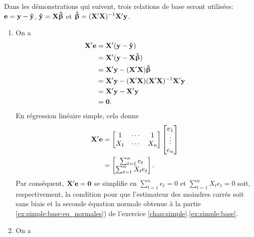 \begin{solution}{3.4}
    Dans les démonstrations qui suivent, trois relations de base
    seront utilisées:
    $\mathbf{e} = \mathbf{y - \hat{y}}$,
    $\mathbf{\hat{y}} = \mathbf{X} \boldsymbol{\hat{\upbeta}}$ et
    $\boldsymbol{\hat{\upbeta}} = (\mathbf{X}^\prime \mathbf{X})^{-1} \mathbf{X}^\prime \mathbf{y}$.
    \begin{enumerate}
    \item On a
      \begin{align*}
        \mathbf{X}^\prime \mathbf{e}
        &= \mathbf{X}^\prime (\mathbf{y - \hat{y}}) \\
        &= \mathbf{X}^\prime (\mathbf{y} - \mathbf{X} \boldsymbol{\hat{\upbeta}}) \\
        &= \mathbf{X}^\prime \mathbf{y} - (\mathbf{X}^\prime \mathbf{X}) \boldsymbol{\hat{\upbeta}} \\
        &= \mathbf{X}^\prime \mathbf{y} - (\mathbf{X}^\prime \mathbf{X})
        (\mathbf{X}^\prime \mathbf{X})^{-1} \mathbf{X}^\prime \mathbf{y} \\
        &= \mathbf{X}^\prime \mathbf{y} - \mathbf{X}^\prime \mathbf{y} \\
        &= \mathbf{0}.
      \end{align*}
      En régression linéaire simple, cela donne
      \begin{align*}
        \mathbf{X}^\prime \mathbf{e} &=
        \begin{bmatrix}
          1   & \cdots & 1  \\
          X_1 & \cdots & X_n
        \end{bmatrix}
        \begin{bmatrix}
          e_1 \\ \vdots \\ e_n
        \end{bmatrix} \\
        &=
        \begin{bmatrix}
          \sum_{t=1}^n e_t \\
          \sum_{t=1}^n X_t e_t
        \end{bmatrix}.
      \end{align*}
      Par conséquent, $\mathbf{X}^\prime \mathbf{e} = \mathbf{0}$ se simplifie
      en $\sum_{t=1}^n e_t = 0$ et $\sum_{t=1}^n X_t e_t = 0$ soit,
      respectivement, la condition pour que l'estimateur des moindres
      carrés soit sans biais et la seconde équation normale obtenue à
      la partie \ref{ex:simple:base:eq_normales}) de l'exercice
      \ref{chap:simple}.\ref{ex:simple:base}.
     \item On a
       \begin{align*}

\end{align*}
\end{enumerate}
\end{solution}
